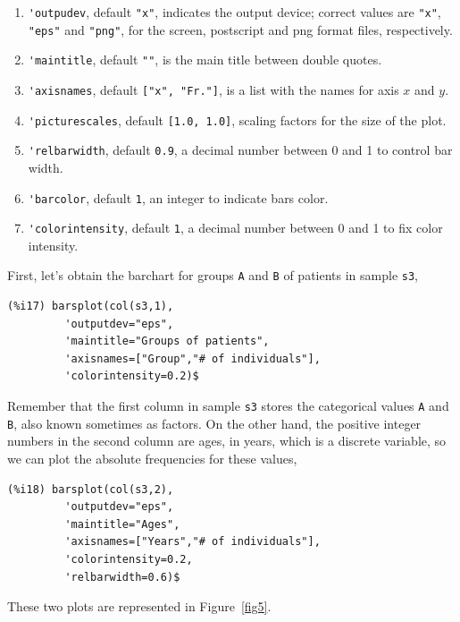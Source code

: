 \documentclass[12pt,a4paper]{article}
\begin{document}
\begin{description}
\begin{enumerate}
\item \verb|'outpudev|, default \verb|"x"|, indicates the output device; correct values are \verb|"x"|, \verb|"eps"| and \verb|"png"|, for the screen, postscript and png format files, respectively.
\item \verb|'maintitle|, default \verb|""|, is the main title between double quotes.
\item \verb|'axisnames|, default \verb|["x", "Fr."]|, is a list with the names for axis $x$ and $y$.
\item \verb|'picturescales|, default \verb|[1.0, 1.0]|, scaling factors for the size of the plot.
\item \verb|'relbarwidth|, default \verb|0.9|, a decimal number between 0 and 1 to control bar width.
\item \verb|'barcolor|, default \verb|1|, an integer to indicate bars color.
\item \verb|'colorintensity|, default \verb|1|, a decimal number between 0 and 1 to fix color intensity.
\end{enumerate}

First, let's obtain the barchart for groups \verb|A| and \verb|B| of patients in sample \verb|s3|,
\begin{verbatim}
(%i17) barsplot(col(s3,1),
         'outputdev="eps",
         'maintitle="Groups of patients",
         'axisnames=["Group","# of individuals"],
         'colorintensity=0.2)$
\end{verbatim}
Remember that the first column in sample \verb|s3| stores the categorical values \verb|A| and \verb|B|, also known sometimes as factors. On the other hand, the positive integer numbers in the second column are ages, in years, which is a discrete variable, so we can plot the absolute frequencies for these values,
\begin{verbatim}
(%i18) barsplot(col(s3,2),
         'outputdev="eps",
         'maintitle="Ages",
         'axisnames=["Years","# of individuals"],
         'colorintensity=0.2,
         'relbarwidth=0.6)$
\end{verbatim}

These two plots are represented in Figure~\ref{fig5}.


\end{description}
\end{document}
